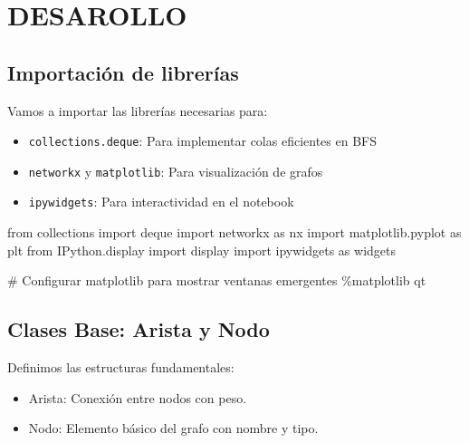 \documentclass[
  spanish,
  letterpaper,
  DIV=11,
  numbers=noendperiod]{scrartcl}
\newenvironment{Shaded}{\begin{snugshade}}{\end{snugshade}}
\newcommand{\CommentTok}[1]{\textcolor[rgb]{0.37,0.37,0.37}{#1}}
\newcommand{\ImportTok}[1]{\textcolor[rgb]{0.00,0.46,0.62}{#1}}
\newcommand{\NormalTok}[1]{\textcolor[rgb]{0.00,0.23,0.31}{#1}}
\newcommand{\OperatorTok}[1]{\textcolor[rgb]{0.37,0.37,0.37}{#1}}
\begin{document}
\section{DESAROLLO}\label{desarollo}

\subsection{Importación de
librerías}\label{importaciuxf3n-de-libreruxedas}

Vamos a importar las librerías necesarias para:

\begin{itemize}
\item
  \texttt{collections.deque}: Para implementar colas eficientes en BFS
\item
  \texttt{networkx} y \texttt{matplotlib}: Para visualización de grafos
\item
  \texttt{ipywidgets}: Para interactividad en el notebook
\end{itemize}

\begin{Shaded}
\begin{Highlighting}[]
\ImportTok{from}\NormalTok{ collections }\ImportTok{import}\NormalTok{ deque}
\ImportTok{import}\NormalTok{ networkx }\ImportTok{as}\NormalTok{ nx}
\ImportTok{import}\NormalTok{ matplotlib.pyplot }\ImportTok{as}\NormalTok{ plt}
\ImportTok{from}\NormalTok{ IPython.display }\ImportTok{import}\NormalTok{ display}
\ImportTok{import}\NormalTok{ ipywidgets }\ImportTok{as}\NormalTok{ widgets}

\CommentTok{\# Configurar matplotlib para mostrar ventanas emergentes}
\OperatorTok{\%}\NormalTok{matplotlib qt}
\end{Highlighting}
\end{Shaded}

\subsection{Clases Base: Arista y Nodo}\label{clases-base-arista-y-nodo}

Definimos las estructuras fundamentales:

\begin{itemize}
\item
  Arista: Conexión entre nodos con peso.
\item
  Nodo: Elemento básico del grafo con nombre y tipo.
\end{itemize}
\end{document}
